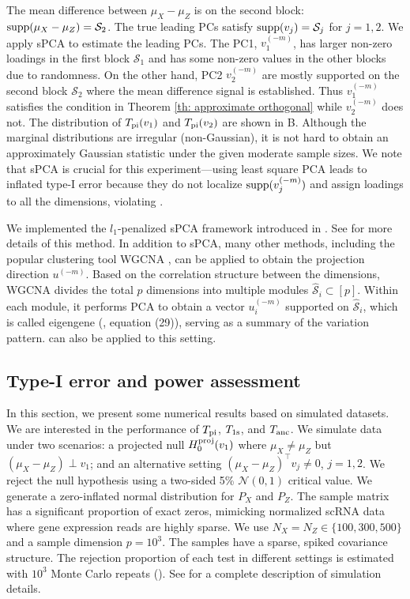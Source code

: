 \documentclass[11pt]{article}
\begin{document}
The mean difference between $\mu_X-\mu_Z$ is on the second block: ${\rm supp}(\mu_X-\mu_Z) = \mathcal{S}_2$. The true leading PCs satisfy ${\rm supp}(v_j) = \mathcal{S}_j$ for $j = 1,2$. We apply sPCA to estimate the leading PCs. The PC1, $v_1^{(-m)}$, has larger non-zero loadings in the first block $\mathcal{S}_1$ and has some non-zero values in the other blocks due to randomness. On the other hand, PC2 $v_2^{(-m)}$ are mostly supported on the second block $\mathcal{S}_2$ where the mean difference signal is established. Thus $v_1^{(-m)}$ satisfies the condition in Theorem \ref{th: approximate orthogonal} while $v_2^{(-m)}$ does not. The distribution of $T_{\rm pi}(v_1)$ and $T_{\rm pi}(v_2)$ are shown in B. Although the marginal distributions are irregular (non-Gaussian), it is not hard to obtain an approximately Gaussian statistic under the given moderate sample sizes. We note that sPCA is crucial for this experiment---using least square PCA leads to inflated type-I error because they do not localize ${\rm supp}(v_j^{(-m)})$ and assign loadings to all the dimensions, violating .

We implemented the $l_1$-penalized sPCA framework introduced in \cite{witten2009penalized}. See  for more details of this method. In addition to sPCA, many other methods, including the popular clustering tool WGCNA \cite{langfelder2008wgcna}, can be applied to obtain the projection direction $u^{(-m)}$. Based on the correlation structure between the dimensions, WGCNA divides the total $p$ dimensions into multiple modules $\hat{\mathcal{S}}_i\subset [p]$. Within each module, it performs PCA to obtain a vector $u_i^{(-m)}$ supported on $\hat{\mathcal{S}}_i$, which is called eigengene (\cite{langfelder2007eigengene}, equation (29)), serving as a summary of the variation pattern.  can also be applied to this setting.

\subsection{Type-I error and power assessment}

In this section, we present some numerical results based on simulated datasets. We are interested in the performance of $T_{\rm pi}$, $T_{\rm 1s}$, and $T_{\rm anc}$. We simulate data under two scenarios: a projected null $H_0^{\rm proj}(v_1)$ where $\mu_X\neq \mu_Z$ but $(\mu_X - \mu_Z)\perp v_1$; and an alternative setting $(\mu_X - \mu_Z)^\top v_j \neq 0$, $j = 1,2$. We reject the null hypothesis using a two-sided 5\% $\mathcal N(0,1)$ critical value. We generate a zero-inflated normal distribution for $P_X$ and $P_Z$. The sample matrix has a significant proportion of exact zeros, mimicking normalized scRNA data where gene expression reads are highly sparse. We use $N_X = N_Z\in \{100, 300, 500\}$ and a sample dimension $p = 10^3$. The samples have a sparse, spiked covariance structure. The rejection proportion of each test in different settings is estimated with $10^3$ Monte Carlo repeats (). See  for a complete description of simulation details.
\end{document}

